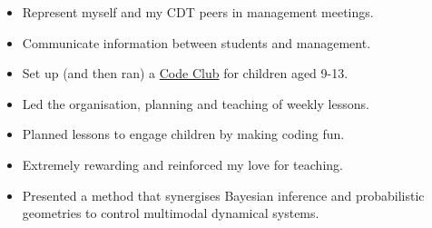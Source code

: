 \documentclass[10pt,a4paper,ragged2e,withhyper]{altacv}
\begin{document}
\begin{paracol}{2}
\label{sec:orga9abeef}

\begin{itemize}
\item Represent myself and my CDT peers in management meetings.
\item Communicate information between students and management.
\end{itemize}


\par\divider
{}

\begin{itemize}
\item Set up (and then ran) a \href{https://codeclub.org/en/}{Code Club} for children aged 9-13.
\item Led the organisation, planning and teaching of weekly lessons.
\item Planned lessons to engage children by making coding fun.
\item Extremely rewarding and reinforced my love for teaching.
\end{itemize}


\label{sec:org9cb68d6}

\begin{itemize}
\item Presented a method that synergises Bayesian inference and probabilistic geometries to control multimodal dynamical systems.
\end{itemize}


\label{sec:org17fc78b}
\nocite{*}
\printbibliography[heading=pubtype,title={\printinfo{\faUsers}{Conference Proceedings}},type=inproceedings]
\switchcolumn


\end{paracol}
\end{document}
